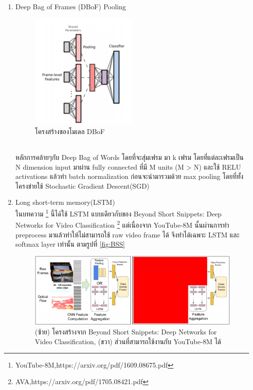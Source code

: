 \begin{enumerate}
\begin{enumerate}
		\item Deep Bag of Frames (DBoF) Pooling
		\begin{figure}[!ht]
			\centering
			\includegraphics[width=0.5\textwidth]{chapter2/images/DBoF.png}
				\caption{โครงสร้างของโมเดล DBoF}
    			\label{fig:DBoF}
		\end{figure}
		\\ หลักการคล้ายๆกับ Deep Bag of Words โดยที่จะสุ่มเฟรม มา k เฟรม โดยที่แต่ละเฟรมเป็น N dimension input มาผ่าน fully connected ที่มี M units (M > N) และใช้ RELU activations แล้วทำ batch normalization ก่อนจะนำมารวมด้วย max pooling โดยที่ทั้งโครงข่ายใช้ Stochastic  Gradient Descent(SGD) 
		\clearpage
		\item Long short-term memory(LSTM)
		\\ ในบทความ \footnote{YouTube-8M,https://arxiv.org/pdf/1609.08675.pdf} นี้ได้ใช้ LSTM แบบเดียวกับของ Beyond Short Snippets: Deep Networks for Video Classification \footnote{AVA,https://arxiv.org/pdf/1705.08421.pdf} แต่เนื่องจาก YouTube-8M นั้นผ่านการทำ preprocess มาแล้วทำให้ไม่สามารถใช้ raw video frame ได้ จึงทำได้เฉพาะ LSTM และ softmax layer เท่านั้น ตามรูปที่ \ref{fig:BSS}
		\begin{figure}[!ht]
			\centering
			\includegraphics[width=1\textwidth]{chapter2/images/BSS.png}
			\caption{(ซ้าย) โครงสร้างจาก Beyond Short Snippets: Deep Networks for Video Classification, (ขวา) ส่วนที่สามารถใช้งานกับ YouTube-8M ได้}

\end{figure}
\end{enumerate}
\end{enumerate}
